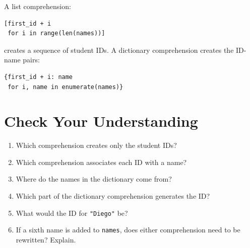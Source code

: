 \documentclass{article}
\begin{document}
A list comprehension:

\begin{verbatim}
[first_id + i
 for i in range(len(names))]
\end{verbatim}
\noindent
creates a sequence of student IDs.  A dictionary comprehension creates the ID-name pairs:

\begin{verbatim}
{first_id + i: name
 for i, name in enumerate(names)}
\end{verbatim}

\section{Check Your Understanding}

\begin{enumerate}
\item Which comprehension creates only the student IDs?

\item Which comprehension associates each ID with a name?

\item Where do the names in the dictionary come from?

\item Which part of the dictionary comprehension generates
the ID?

\item What would the ID for \texttt{"Diego"} be?

\item If a sixth name is added to \texttt{names}, does either
comprehension need to be rewritten? Explain.
\end{enumerate}
\end{document}
